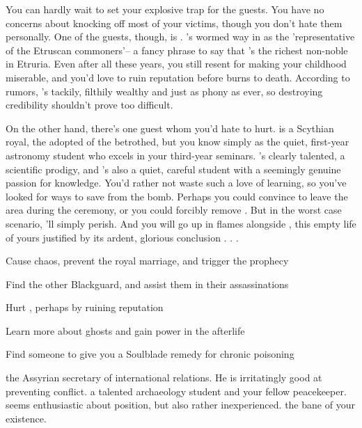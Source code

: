 \documentclass[char]{Kos}
\begin{document}
You can hardly wait to set your explosive trap for the guests. You have no concerns about knocking off most of your victims, though you don't hate them personally. One of the guests, though, is \cMerchant{}. \cMerchant{\They}'s wormed \cMerchant{\their} way in as the 'representative of the Etruscan commoners'-- a fancy phrase to say that \cMerchant{\they}'s the richest non-noble in Etruria. Even after all these years, you still resent \cMerchant{\them} for making your childhood miserable, and you'd love to ruin \cMerchant{\their} reputation before \cMerchant{\they} burns to death. According to rumors, \cMerchant{\they}'s tackily, filthily wealthy and just as phony as ever, so destroying \cMerchant{\their} credibility shouldn't prove too difficult.

On the other hand, there's one guest whom you'd hate to hurt. \cWard{} is a Scythian royal, the adopted \cWard{\sibling} of the betrothed, but you know \cWard{\them} simply as the quiet, first-year astronomy student who excels in your third-year seminars. \cWard{\They}'s clearly talented, a scientific prodigy, and \cWard{\they}'s also a quiet, careful student with a seemingly genuine passion for knowledge. You'd rather not waste such a love of learning, so you've looked for ways to save \cWard{\them} from the bomb. Perhaps you could convince \cWard{\them} to leave the area during the ceremony, or you could forcibly remove \cWard{\them}. But in the worst case scenario, \cWard{\they}'ll simply perish. And you will go up in flames alongside \cWard{\them}, this empty life of yours justified by its ardent, glorious conclusion . . .

\begin{itemz}[Goals]
\item Cause chaos, prevent the royal marriage, and trigger the prophecy
\item Find the other Blackguard, and assist them in their assassinations
\item Hurt \cMerchant{}, perhaps by ruining \cMerchant{\their} reputation
\item Learn more about ghosts and gain power in the afterlife
\item Find someone to give you a Soulblade remedy for chronic poisoning
\end{itemz}

\begin{contacts}
 the Assyrian secretary of international relations. He is irritatingly good at preventing conflict.
\contact{\cArchaeologist{}} a talented archaeology student and your fellow peacekeeper.  seems enthusiastic about \cArchaeologist{\their} position, but also rather inexperienced.
\contact{\cMerchant{}} the bane of your existence.
\end{contacts}
\end{document}
